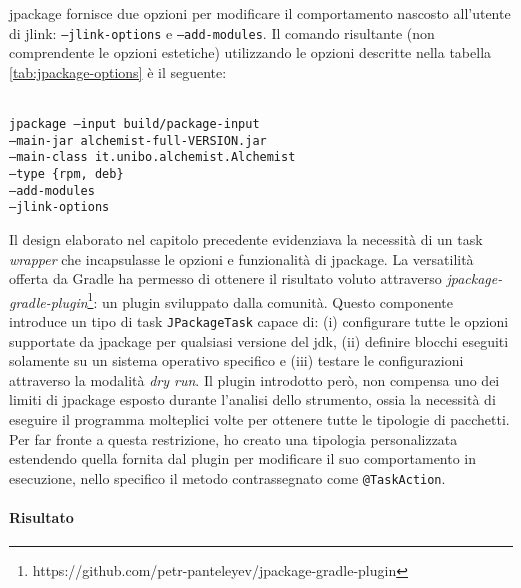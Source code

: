 jpackage fornisce due opzioni per modificare il comportamento nascosto all'utente di jlink: \texttt{--jlink-options} e \texttt{--add-modules}. Il comando risultante (non comprendente le opzioni estetiche) utilizzando le opzioni descritte nella tabella \ref{tab:jpackage-options} è il seguente:

\texttt{\\ jpackage --input build/package-input \\ \tab\tab --main-jar alchemist-full-VERSION.jar \\ \tab\tab --main-class it.unibo.alchemist.Alchemist \\ \tab\tab --type \{rpm, deb\} \\ \tab\tab --add-modules \\ \tab\tab --jlink-options \\}


Il design elaborato nel capitolo precedente evidenziava la necessità di un task \textit{wrapper} che incapsulasse le opzioni e funzionalità di jpackage. La versatilità offerta da Gradle ha permesso di ottenere il risultato voluto attraverso \textit{jpackage-gradle-plugin}\footnote{https://github.com/petr-panteleyev/jpackage-gradle-plugin}: un plugin sviluppato dalla comunità. Questo componente introduce un tipo di task \texttt{JPackageTask} capace di: (i) configurare tutte le opzioni supportate da jpackage per qualsiasi versione del \ac{jdk}, (ii) definire blocchi eseguiti solamente su un sistema operativo specifico e (iii) testare le configurazioni attraverso la modalità \textit{dry run}. Il plugin introdotto però, non compensa uno dei limiti di jpackage esposto durante l'analisi dello strumento, ossia la necessità di eseguire il programma molteplici volte per ottenere tutte le tipologie di pacchetti. Per far fronte a questa restrizione, ho creato una tipologia personalizzata estendendo quella fornita dal plugin per modificare il suo comportamento in esecuzione, nello specifico il metodo contrassegnato come \texttt{@TaskAction}.



\paragraph{Risultato}

